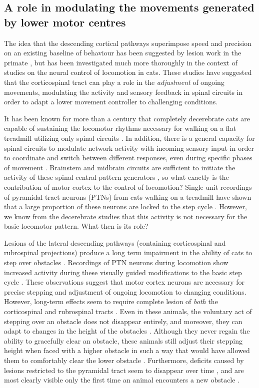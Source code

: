 \subsection{A role in modulating the movements generated by lower motor centres}

The idea that the descending cortical pathways superimpose speed and precision on an existing baseline of behaviour has been suggested by lesion work in the primate \citep{Lawrence1968a}, but has been investigated much more thoroughly in the context of studies on the neural control of locomotion in cats. These studies have suggested that the corticospinal tract can play a role in the \emph{adjustment} of ongoing movements, modulating the activity and sensory feedback in spinal circuits in order to adapt a lower movement controller to challenging conditions.

It has been known for more than a century that completely decerebrate cats are capable of sustaining the locomotor rhythms necessary for walking on a flat treadmill utilizing only spinal circuits \citep{GrahamBrown1911}. In addition, there is a general capacity for spinal circuits to modulate network activity with incoming sensory input in order to coordinate and switch between different responses, even during specific phases of movement \citep{Forssberg1975}. Brainstem and midbrain circuits are sufficient to initiate the activity of these spinal central pattern generators \citep{Grillner1973}, so what exactly is the contribution of motor cortex to the control of locomotion? Single-unit recordings of pyramidal tract neurons (PTNs) from cats walking on a treadmill have shown that a large proportion of these neurons are locked to the step cycle \citep{Armstrong1984a}. However, we know from the decerebrate studies that this activity is not necessary for the basic locomotor pattern. What then is its role?

Lesions of the lateral descending pathways (containing corticospinal and rubrospinal projections) produce a long term impairment in the ability of cats to step over obstacles \citep{Drew2002}. Recordings of PTN neurons during locomotion show increased activity during these visually guided modifications to the basic step cycle \citep{Drew1996}. These observations suggest that motor cortex neurons are necessary for precise stepping and adjustment of ongoing locomotion to changing conditions. However, long-term effects seem to require complete lesion of \emph{both} the corticospinal and rubrospinal tracts \citep{Drew2002}. Even in these animals, the voluntary act of stepping over an obstacle does not disappear entirely, and moreover, they can adapt to changes in the height of the obstacles \citep{Drew2002}. Although they never regain the ability to gracefully clear an obstacle, these animals still adjust their stepping height when faced with a higher obstacle in such a way that would have allowed them to comfortably clear the lower obstacle \citep{Drew2002}. Furthermore, deficits caused by lesions restricted to the pyramidal tract seem to disappear over time \citep{Liddell1944}, and are most clearly visible only the first time an animal encounters a new obstacle \citep{Liddell1944}.


